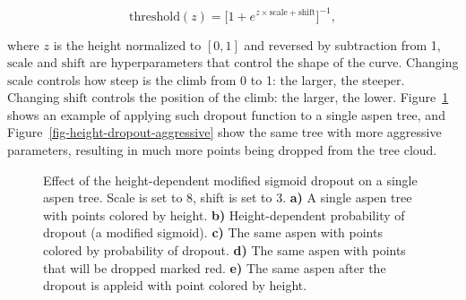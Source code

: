 $$
\text{threshold}(z) = \big[1 + e^{z \times \text{scale} + \text{shift}}\big]^{-1},
$$

where $z$ is the height normalized to $[0, 1]$ and reversed by subtraction from 1, $\text{scale}$ and $\text{shift}$ are hyperparameters that control the shape of the curve.
Changing $\text{scale}$ controls how steep is the climb from 0 to 1: the larger, the steeper.
Changing $\text{shift}$ controls the position of the climb: the larger, the lower.
Figure~\ref{fig-height-dropout} shows an example of applying such dropout function to a single aspen tree, and Figure~\ref{fig-height-dropout-aggressive} show the same tree with more aggressive parameters, resulting in much more points being dropped from the tree cloud.

\begin{figure}
\caption[Effect of the height-dependent modified sigmoid dropout on a single aspen tree.]{\label{fig-height-dropout}Effect of the height-dependent
modified sigmoid dropout on a single aspen tree. Scale is set to 8,
shift is set to 3. \textbf{a)} A single aspen tree with points colored
by height. \textbf{b)} Height-dependent probability of dropout (a
modified sigmoid). \textbf{c)} The same aspen with points colored by
probability of dropout. \textbf{d)} The same aspen with points that will
be dropped marked red. \textbf{e)} The same aspen after the dropout is
appleid with point colored by height.}
\end{figure}

